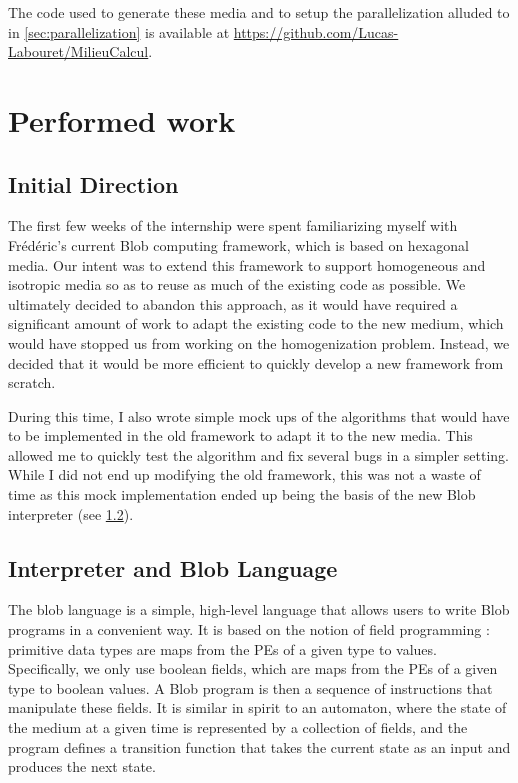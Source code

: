 \documentclass[11pt,a4paper]{report}
\begin{document}
The code used to generate these media and to setup the parallelization alluded to in \ref{sec:parallelization} is available at \url{https://github.com/Lucas-Labouret/MilieuCalcul}.

\chapter{Performed work}

\section{Initial Direction}

The first few weeks of the internship were spent familiarizing myself with Frédéric's current Blob computing framework, which is based on hexagonal media. Our intent was to extend this framework to support homogeneous and isotropic media so as to reuse as much of the existing code as possible. We ultimately decided to abandon this approach, as it would have required a significant amount of work to adapt the existing code to the new medium, which would have stopped us from working on the homogenization problem. Instead, we decided that it would be more efficient to quickly develop a new framework from scratch.

During this time, I also wrote simple mock ups of the algorithms that would have to be implemented in the old framework to adapt it to the new media. This allowed me to quickly test the algorithm and fix several bugs in a simpler setting. While I did not end up modifying the old framework, this was not a waste of time as this mock implementation ended up being the basis of the new Blob interpreter (see \ref{sec:interpreter_and_language}).

\section{Interpreter and Blob Language}
\label{sec:interpreter_and_language}

The blob language is a simple, high-level language that allows users to write Blob programs in a convenient way. It is based on the notion of field programming : primitive data types are maps from the PEs of a given type to values. Specifically, we only use boolean fields, which are maps from the PEs of a given type to boolean values. A Blob program is then a sequence of instructions that manipulate these fields. It is similar in spirit to an automaton, where the state of the medium at a given time is represented by a collection of fields, and the program defines a transition function that takes the current state as an input and produces the next state.
\end{document}
